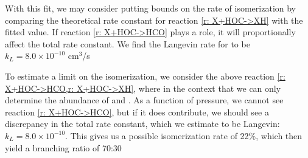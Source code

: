 With this fit, we may consider putting bounds on the rate of isomerization by comparing the theoretical rate constant for reaction \ref{r: X+HOC->XH} with the fitted value. If reaction \ref{r: X+HOC->HCO} plays a role, it will proportionally affect the total rate constant. We find the Langevin rate for  to be $k_L = 8.0 \times 10^{-10}$ cm$^3$/s

To estimate a limit on the isomerization, we consider the above reaction \cref{r: X+HOC->HCO,r: X+HOC->XH}, where  in the context that we can only determine the abundance of \ce{[HCO]+} and . As a function of pressure, we cannot see reaction \ref{r: X+HOC->HCO}, but if it does contribute, we should see a discrepancy in the total rate constant, which we estimate to be Langevin: $k_L = 8.0 \times 10^{-10}$. This gives us a possible isomerization rate of 22\%, which then yield a branching ratio of 70:30

%

